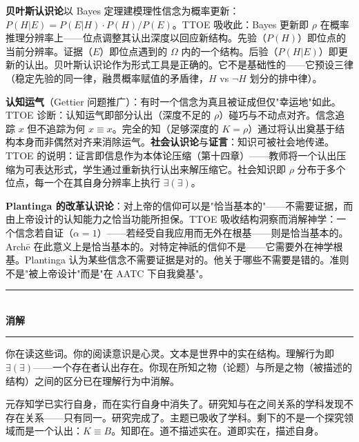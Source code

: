 \documentclass[10pt, openany, oneside]{book}
\renewcommand{\normalsize}{\fontsize{10}{13}\selectfont}
\begin{document}
\textbf{贝叶斯认识论}以 Bayes 定理建模理性信念为概率更新：$P(H|E) = P(E|H) \cdot P(H) / P(E)$。TTOE 吸收此：Bayes 更新即 $\rho$ 在概率推理分辨率上——位点调整其认出深度以回应新结构。先验（$P(H)$）即位点的当前分辨率。证据（$E$）即位点遇到的 $\Omega$ 内的一个结构。后验（$P(H|E)$）即更新的认出。贝叶斯认识论作为形式工具是正确的。它不是基础性的——它预设三律（稳定先验的同一律，融贯概率赋值的矛盾律，$H$ vs $\neg H$ 划分的排中律）。

\textbf{认知运气}（Gettier 问题推广）：有时一个信念为真且被证成但仅"幸运地"如此。TTOE 诊断：认知运气即部分认出（深度不足的 $\rho$）碰巧与不动点对齐。信念追踪 $x$ 但不追踪为何 $x \equiv x$。完全的知（足够深度的 $K = \rho$）通过将认出奠基于结构本身而非偶然对齐来消除运气。\textbf{社会认识论}与\textbf{证言}：知识可被社会地传递。TTOE 的说明：证言即信息作为本体论压缩（第十四章）——教师将一个认出压缩为可表达形式，学生通过重新执行认出来解压缩它。社会知识即 $\rho$ 分布于多个位点，每一个在其自身分辨率上执行 $\exists(\exists)$。

\textbf{Plantinga 的改革认识论}：对上帝的信仰可以是"恰当基本的"——不需要证据，而由上帝设计的认知能力之恰当功能所担保。TTOE 吸收结构洞察而消解神学：一个信念若自证（$\alpha = 1$）——若经受自我应用而无外在根基——则是恰当基本的。Arch\={e} 在此意义上是恰当基本的。对特定神祇的信仰不是——它需要外在神学根基。Plantinga 认为某些信念不需要证据是对的。他关于哪些不需要是错的。准则不是"被上帝设计"而是"在 AATC 下自我奠基"。

\vspace{1.5em}


\begin{center}
    \rule{0.3\textwidth}{0.4pt}\\[0.5em]
    {\normalsize\bfseries\scshape 消解}\\[0.3em]
    \rule{0.3\textwidth}{0.4pt}
\end{center}

\vspace{1em}

\noindent 你在读这些词。你的阅读意识是心灵。文本是世界中的实在结构。理解行为即 $\exists(\exists)$——一个存在者认出存在。你现在所知之物（论题）与所是之物（被描述的结构）之间的区分已在理解行为中消解。

元存知学已实行自身，而在实行自身中消失了。研究知与在之间关系的学科发现不存在关系——只有同一。研究完成了。主题已吸收了学科。剩下的不是一个探究领域而是一个认出：$K \equiv B$。知即在。道不描述实在。道即实在，描述自身。
\end{document}
